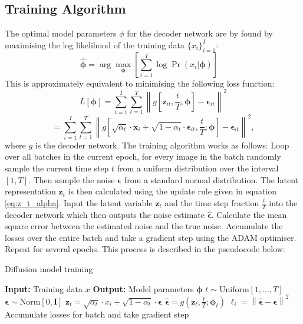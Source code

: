 \documentclass[11pt]{article}
\begin{document}
\subsection{Training Algorithm}
The optimal model parameters $\phi$ for the decoder network are by found by maximising the log likelihood of the training data $\{x_i\}_{i=1}^{I}$:
$$\hat{\boldsymbol{\phi}} = \arg\max_{\boldsymbol{\phi}} \left[ \sum_{i=1}^{I} \log \Pr(x_i | \boldsymbol{\phi}) \right] \quad$$
This is approximately equivalent to minimising the following loss function:
$$
L[\boldsymbol{\phi}] = \sum_{i=1}^{I} \sum_{t=1}^{T} \left\| g[\mathbf{z}_{it}, \frac{t}{T}; \boldsymbol{\phi}] - \boldsymbol{\epsilon}_{it} \right\|^2
$$
\begin{equation}
= \sum_{i=1}^{I} \sum_{t=1}^{T} \left\| g \left[\sqrt{\alpha_t} \cdot \mathbf{x}_i + \sqrt{1 - \alpha_t} \cdot \boldsymbol{\epsilon}_{it}, \frac{t}{T}; \boldsymbol{\phi} \right] - \boldsymbol{\epsilon}_{it} \right\|^2,
\label{eq:loss_function}
\end{equation}
where $g$ is the decoder network. The training algorithm works as follows: Loop over all batches in the current epoch, for every image in the batch randomly sample the current time step $t$ from a uniform distribution over the interval $[1, T]$. Then sample the noise $\boldsymbol{\epsilon}$ from a standard normal distribution. The latent representation $\boldsymbol{\mathbf{z}}_{t}$ is then calculated using the update rule given in equation \eqref{eq:z_t_alpha}. Input the latent variable $\boldsymbol{\mathbf{z}}_{t}$ and the time step fraction $\frac{t}{T}$ into the decoder network which then outputs the noise estimate $\hat{\boldsymbol{\epsilon}}$. Calculate the mean square error between the estimated noise and the true noise. Accumulate the losses over the entire batch and take a gradient step using the ADAM optimiser. Repeat for several epochs. This process is described in the pseudocode below:

\begin{algorithm}[H]
    \caption{Diffusion model training}
    \begin{algorithmic}[1]
    \State \textbf{Input:} Training data $x$
    \State \textbf{Output:} Model parameters $\boldsymbol{\phi}$
     
         
            \State $t \sim \text{Uniform}[1, \ldots, T]$ 
            \State $\boldsymbol{\epsilon} \sim \text{Norm}[0, \mathbf{I}]$ 
            \State $\boldsymbol{z}_{t} = \sqrt{\alpha_t} \cdot x_i + \sqrt{1 - \alpha_t} \cdot \boldsymbol{\epsilon}$ 
            \State $\hat{\boldsymbol{\epsilon}} = g \left( \boldsymbol{z}_{t}, \frac{t}{T}; \boldsymbol{\phi}_t \right)$ 
            \State $\ell_i = \left\|\hat{\boldsymbol{\epsilon}} - \boldsymbol{\epsilon} \right\|^2$ 
        \EndFor
        \State Accumulate losses for batch and take gradient step
    \EndWhile
    \end{algorithmic}
\end{algorithm}
\end{document}

